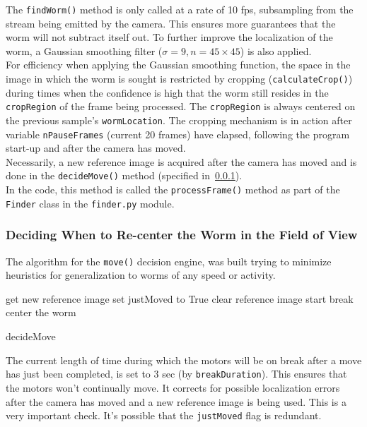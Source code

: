 \documentclass[main.tex]{subfiles}
\begin{document}
The \verb|findWorm()| method is only called at a rate of 10 fps, subsampling from the stream being emitted by the camera. This ensures more guarantees that the worm will not subtract itself out. To further improve the localization of the worm, a Gaussian smoothing filter ($\sigma = 9, n = 45 \times 45$) is also applied.\\ 

For efficiency when applying the Gaussian smoothing function, the space in the image in which the worm is sought is restricted by cropping (\verb|calculateCrop()|) during times when the confidence is high that the worm still resides in the \verb|cropRegion| of the frame being processed. The \verb|cropRegion| is always centered on the previous sample's \verb|wormLocation|. The cropping mechanism is in action after variable \verb|nPauseFrames| (current 20 frames) have elapsed, following the program start-up and after the camera has moved.\\

Necessarily, a new reference image is acquired after the camera has moved and is done in the \verb|decideMove()| method (specified in~\ref{ss:center}). \\

In the code, this method is called the \verb|processFrame()| method as part of the \verb|Finder| class in the \verb|finder.py| module. 

\clearpage
\subsubsection{Deciding When to Re-center the Worm in the Field of View}
\label{ss:center}
The algorithm for the \verb|move()| decision engine, was built trying to minimize heuristics for generalization to worms of any speed or activity. \\

\begin{algorithm}[h]
    {
        {
            get new reference image\;
        }
        {
            {
                set justMoved to True\;
                clear reference image\;
                start break\;
                center the worm\;
            }
        }
    }
\caption{decideMove}
\end{algorithm}
The current length of time during which the motors will be on break after a move has just been completed, is set to 3 sec (by \verb|breakDuration|). This ensures that the motors won't continually move. It corrects for possible localization errors after the camera has moved and a new reference image is being used. This is a very important check. It's possible that the \verb|justMoved| flag is redundant. \\
\end{document}
